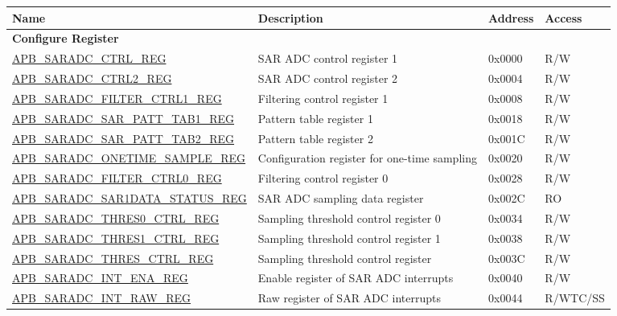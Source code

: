 \begin{longtable}{ | p{6.5cm} | p{6.7cm} | p{1.3cm} | p{1.6cm} | }
\hline\rowcolor{lightgray}
\textbf{Name} & \textbf{Description} &  \textbf{Address} & \textbf{Access} \\ \hline
\endhead
\multicolumn{4}{|l|}{\textbf{Configure Register}} \\ \hline
\hyperref[regdesc:APBSARADCCTRLREG]{APB\_SARADC\_CTRL\_REG} & SAR ADC control register 1 & 0x0000 & R/W \\ \hline
\hyperref[regdesc:APBSARADCCTRL2REG]{APB\_SARADC\_CTRL2\_REG} & SAR ADC control register 2 & 0x0004 & R/W \\ \hline
\hyperref[regdesc:APBSARADCFILTERCTRL1REG]{APB\_SARADC\_FILTER\_CTRL1\_REG} & Filtering control register 1 & 0x0008 & R/W \\ \hline
\hyperref[regdesc:APBSARADCSARPATTTAB1REG]{APB\_SARADC\_SAR\_PATT\_TAB1\_REG} & Pattern table register 1 & 0x0018 & R/W \\ \hline
\hyperref[regdesc:APBSARADCSARPATTTAB2REG]{APB\_SARADC\_SAR\_PATT\_TAB2\_REG} & Pattern table register 2 & 0x001C & R/W \\ \hline
\hyperref[regdesc:APBSARADCONETIMESAMPLEREG]{APB\_SARADC\_ONETIME\_SAMPLE\_REG} & Configuration register for one-time sampling & 0x0020 & R/W \\ \hline
\hyperref[regdesc:APBSARADCFILTERCTRL0REG]{APB\_SARADC\_FILTER\_CTRL0\_REG} & Filtering control register 0 & 0x0028 & R/W \\ \hline
\hyperref[regdesc:APBSARADCSAR1DATASTATUSREG]{APB\_SARADC\_SAR1DATA\_STATUS\_REG} & SAR ADC sampling data register & 0x002C & RO \\ \hline
\hyperref[regdesc:APBSARADCTHRES0CTRLREG]{APB\_SARADC\_THRES0\_CTRL\_REG} & Sampling threshold control register 0 & 0x0034 & R/W \\ \hline
\hyperref[regdesc:APBSARADCTHRES1CTRLREG]{APB\_SARADC\_THRES1\_CTRL\_REG} & Sampling threshold control register 1 & 0x0038 & R/W \\ \hline
\hyperref[regdesc:APBSARADCTHRESCTRLREG]{APB\_SARADC\_THRES\_CTRL\_REG} & Sampling threshold control register & 0x003C & R/W \\ \hline
\hyperref[regdesc:APBSARADCINTENAREG]{APB\_SARADC\_INT\_ENA\_REG} & Enable register of SAR ADC interrupts & 0x0040 & R/W \\ \hline
\hyperref[regdesc:APBSARADCINTRAWREG]{APB\_SARADC\_INT\_RAW\_REG} & Raw register of SAR ADC interrupts & 0x0044 & R/WTC/SS \\ \hline

\end{longtable}
